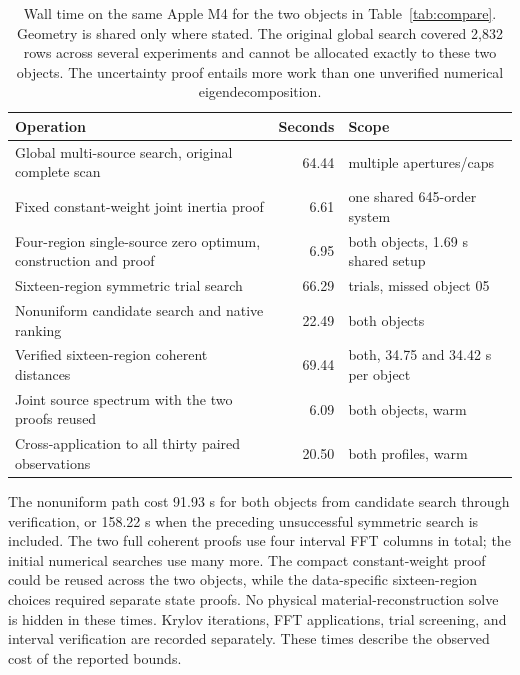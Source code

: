 \documentclass[anonymous,12pt]{iopjournal}
\theoremstyle{remark}\newtheorem{remark}[theorem]{Remark}
\numberwithin{equation}{section}
\begin{document}
\begin{table}[tb]
\caption{Wall time on the same Apple M4 for the two objects in Table~\ref{tab:compare}. Geometry is shared only where stated. The original global search covered 2,832 rows across several experiments and cannot be allocated exactly to these two objects. The uncertainty proof entails more work than one unverified numerical eigendecomposition.}\label{tab:cost}
\centering\begin{tabular}{@{}>{\raggedright\arraybackslash}p{.52\linewidth}r>{\raggedright\arraybackslash}p{.27\linewidth}@{}}\toprule
Operation & Seconds & Scope\\ \midrule
Global multi-source search, original complete scan &64.44& multiple apertures/caps\\
Fixed constant-weight joint inertia proof &6.61& one shared 645-order system\\
Four-region single-source zero optimum, construction and proof &6.95& both objects, 1.69 s shared setup\\
Sixteen-region symmetric trial search &66.29& 84 trials, missed object 05\\
Nonuniform candidate search and native ranking &22.49& both objects\\
Verified sixteen-region coherent distances &69.44& both, 34.75 and 34.42 s per object\\
Joint source spectrum with the two proofs reused &6.09& both objects, warm\\
Cross-application to all thirty paired observations &20.50& both profiles, warm\\ \bottomrule
\end{tabular}
\end{table}

The nonuniform path cost 91.93 s for both objects from candidate search through verification, or 158.22 s when the preceding unsuccessful symmetric search is included. The two full coherent proofs use four interval FFT columns in total; the initial numerical searches use many more. The compact constant-weight proof could be reused across the two objects, while the data-specific sixteen-region choices required separate state proofs. No physical material-reconstruction solve is hidden in these times. Krylov iterations, FFT applications, trial screening, and interval verification are recorded separately. These times describe the observed cost of the reported bounds.
\end{document}
